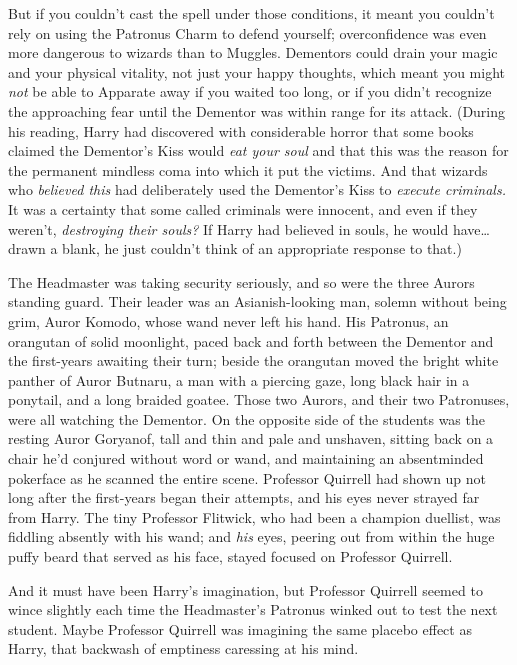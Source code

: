 But if you couldn't cast the spell under those conditions, it meant you
couldn't rely on using the Patronus Charm to defend yourself; overconfidence
was even more dangerous to wizards than to Muggles. Dementors could drain your
magic and your physical vitality, not just your happy thoughts, which meant you
might \emph{not} be able to Apparate away if you waited too long, or if you
didn't recognize the approaching fear until the Dementor was within range for
its attack. (During his reading, Harry had discovered with considerable horror
that some books claimed the Dementor's Kiss would \emph{eat your soul} and that
this was the reason for the permanent mindless coma into which it put the
victims. And that wizards who \emph{believed this} had deliberately used the
Dementor's Kiss to \emph{execute criminals.} It was a certainty that some
called criminals were innocent, and even if they weren't, \emph{destroying
their souls?} If Harry had believed in souls, he would have{\ldots} drawn a
blank, he just couldn't think of an appropriate response to that.)

The Headmaster was taking security seriously, and so were the three Aurors
standing guard. Their leader was an Asianish-looking man, solemn without being
grim, Auror Komodo, whose wand never left his hand. His Patronus, an orangutan
of solid moonlight, paced back and forth between the Dementor and the
first-years awaiting their turn; beside the orangutan moved the bright white
panther of Auror Butnaru, a man with a piercing gaze, long black hair in a
ponytail, and a long braided goatee. Those two Aurors, and their two
Patronuses, were all watching the Dementor. On the opposite side of the
students was the resting Auror Goryanof, tall and thin and pale and unshaven,
sitting back on a chair he'd conjured without word or wand, and maintaining an
absentminded pokerface as he scanned the entire scene. Professor Quirrell had
shown up not long after the first-years began their attempts, and his eyes
never strayed far from Harry. The tiny Professor Flitwick, who had been a
champion duellist, was fiddling absently with his wand; and \emph{his} eyes,
peering out from within the huge puffy beard that served as his face, stayed
focused on Professor Quirrell.

And it must have been Harry's imagination, but Professor Quirrell seemed to
wince slightly each time the Headmaster's Patronus winked out to test the next
student. Maybe Professor Quirrell was imagining the same placebo effect as
Harry, that backwash of emptiness caressing at his mind.

